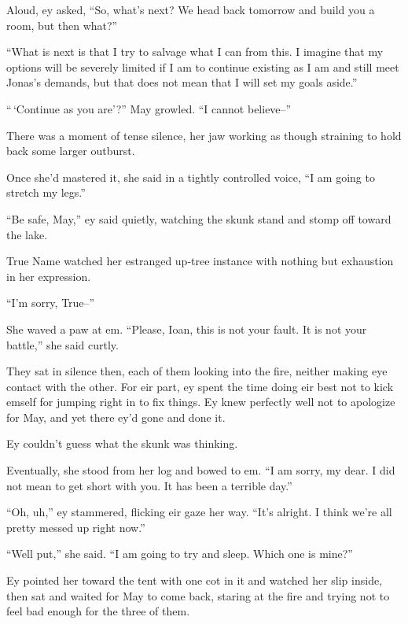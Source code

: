 Aloud, ey asked, ``So, what's next? We head back tomorrow and build you a room, but then what?''

``What is next is that I try to salvage what I can from this. I imagine that my options will be severely limited if I am to continue existing as I am and still meet Jonas's demands, but that does not mean that I will set my goals aside.''

``\,`Continue as you are'?'' May growled. ``I cannot believe--''

There was a moment of tense silence, her jaw working as though straining to hold back some larger outburst.

Once she'd mastered it, she said in a tightly controlled voice, ``I am going to stretch my legs.''

``Be safe, May,'' ey said quietly, watching the skunk stand and stomp off toward the lake.

True Name watched her estranged up-tree instance with nothing but exhaustion in her expression.

``I'm sorry, True--''

She waved a paw at em. ``Please, Ioan, this is not your fault. It is not your battle,'' she said curtly.

They sat in silence then, each of them looking into the fire, neither making eye contact with the other. For eir part, ey spent the time doing eir best not to kick emself for jumping right in to fix things. Ey knew perfectly well not to apologize for May, and yet there ey'd gone and done it.

Ey couldn't guess what the skunk was thinking.

Eventually, she stood from her log and bowed to em. ``I am sorry, my dear. I did not mean to get short with you. It has been a terrible day.''

``Oh, uh,'' ey stammered, flicking eir gaze her way. ``It's alright. I think we're all pretty messed up right now.''

``Well put,'' she said. ``I am going to try and sleep. Which one is mine?''

Ey pointed her toward the tent with one cot in it and watched her slip inside, then sat and waited for May to come back, staring at the fire and trying not to feel bad enough for the three of them.

